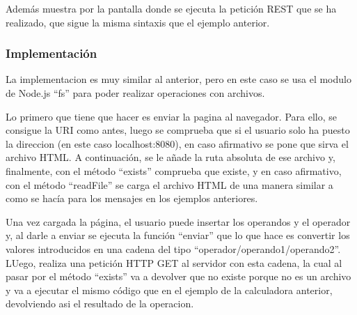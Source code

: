 \documentclass{article}
\begin{document}
Además muestra por la pantalla donde se ejecuta la petición REST que se ha realizado, que sigue la misma sintaxis que el ejemplo anterior.

\subsubsection{Implementación}
La implementacion es muy similar al anterior, pero en este caso se usa el modulo de Node.js ``fs'' para poder realizar operaciones con archivos.

Lo primero que tiene que hacer es enviar la pagina al navegador. Para ello, se consigue la URI como antes, luego se comprueba que si el usuario solo ha puesto la direccion (en este caso localhost:8080), en caso afirmativo se pone que sirva el archivo HTML. A continuación, se le añade la ruta absoluta de ese archivo y, finalmente, con el método ``exists'' comprueba que existe, y en caso afirmativo, con el método ``readFile'' se carga el archivo HTML de una manera similar a como se hacía para los mensajes en los ejemplos anteriores.

Una vez cargada la página, el usuario puede insertar los operandos y el operador y, al darle a enviar se ejecuta la función ``enviar'' que lo que hace es convertir los valores introducidos en una cadena del tipo ``operador/operando1/operando2''. LUego, realiza una petición HTTP GET al servidor con esta cadena, la cual al pasar por el método ``exists'' va a devolver que no existe porque no es un archivo y va a ejecutar el mismo código que en el ejemplo de la calculadora anterior, devolviendo asi el resultado de la operacion.
\end{document}
